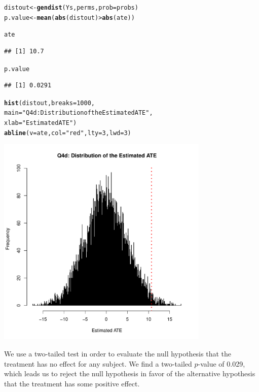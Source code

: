 \documentclass[11pt,notitlepage]{article}\usepackage[]{graphicx}\usepackage[]{color}
\makeatletter
\newcommand{\hlnum}[1]{\textcolor[rgb]{0.686,0.059,0.569}{#1}}%
\newcommand{\hlstr}[1]{\textcolor[rgb]{0.192,0.494,0.8}{#1}}%
\newcommand{\hlopt}[1]{\textcolor[rgb]{0,0,0}{#1}}%
\newcommand{\hlstd}[1]{\textcolor[rgb]{0.345,0.345,0.345}{#1}}%
\newcommand{\hlkwb}[1]{\textcolor[rgb]{0.69,0.353,0.396}{#1}}%
\newcommand{\hlkwc}[1]{\textcolor[rgb]{0.333,0.667,0.333}{#1}}%
\newcommand{\hlkwd}[1]{\textcolor[rgb]{0.737,0.353,0.396}{\textbf{#1}}}%
\newenvironment{kframe}{%
 \def\at@end@of@kframe{}%
 \ifinner\ifhmode%
  \def\at@end@of@kframe{\end{minipage}}%
  \begin{minipage}{\columnwidth}%
 \fi\fi%
 \def\FrameCommand##1{\hskip\@totalleftmargin \hskip-\fboxsep
 \colorbox{shadecolor}{##1}\hskip-\fboxsep
     \hskip-\linewidth \hskip-\@totalleftmargin \hskip\columnwidth}%
 \MakeFramed {\advance\hsize-\width
   \@totalleftmargin\z@ \linewidth\hsize
   \@setminipage}}%
 {\par\unskip\endMakeFramed%
 \at@end@of@kframe}
\newenvironment{knitrout}{}{} %
\makeatother
\begin{document}
\begin{enumerate}[a)]
\begin{knitrout}
\begin{kframe}
\begin{alltt}
\hlstd{distout} \hlkwb{<-} \hlkwd{gendist}\hlstd{(Ys,perms,}\hlkwc{prob}\hlstd{=probs)}
\hlstd{p.value} \hlkwb{<-} \hlkwd{mean}\hlstd{(}\hlkwd{abs}\hlstd{(distout)}\hlopt{>}\hlkwd{abs}\hlstd{(ate))}

\hlstd{ate}
\end{alltt}
\begin{verbatim}
## [1] 10.7
\end{verbatim}
\begin{alltt}
\hlstd{p.value}
\end{alltt}
\begin{verbatim}
## [1] 0.0291
\end{verbatim}
\begin{alltt}
\hlkwd{hist}\hlstd{(distout,} \hlkwc{breaks}\hlstd{=}\hlnum{1000}\hlstd{,}
     \hlkwc{main}\hlstd{=}\hlstr{"Q4d: Distribution of the Estimated ATE"}\hlstd{,}
     \hlkwc{xlab}\hlstd{=}\hlstr{"Estimated ATE"}\hlstd{)}
\hlkwd{abline}\hlstd{(}\hlkwc{v}\hlstd{=ate,} \hlkwc{col}\hlstd{=}\hlstr{"red"}\hlstd{,} \hlkwc{lty}\hlstd{=}\hlnum{3}\hlstd{,} \hlkwc{lwd}\hlstd{=}\hlnum{3}\hlstd{)}
\end{alltt}
\end{kframe}

{\centering \includegraphics[width=4in,height=4in]{figure/PS4-PS4-4-d-1} 

}



\end{knitrout}
We use a two-tailed test in order to evaluate the null hypothesis that the treatment has no effect for any subject.  We find a two-tailed $p$-value of 0.029, which leads us to reject the null hypothesis in favor of the alternative hypothesis that the treatment has some positive effect.


\end{enumerate}
\end{document}
